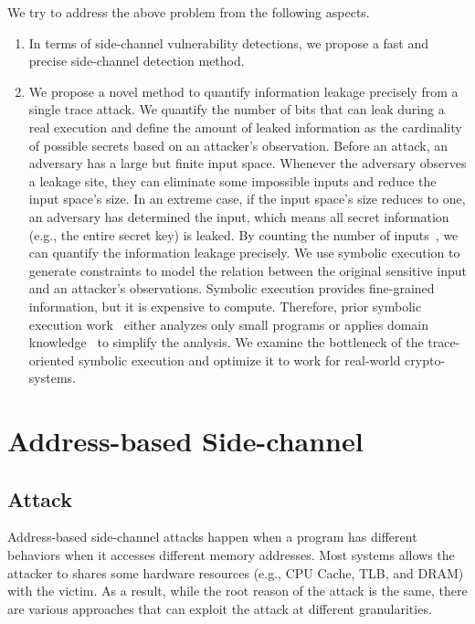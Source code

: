 We try to address the above problem from the following aspects.
\begin{enumerate}
\item In terms of side-channel vulnerability detections, we propose a fast and precise side-channel detection method. 
\item We propose a novel method to quantify information 
leakage precisely from a single trace attack. We quantify the number of bits that can leak during a real execution and define the amount of leaked information as the cardinality of possible secrets based on an attacker's observation. Before an attack, an adversary has a large but finite input space. Whenever the adversary observes a leakage site, they can eliminate some impossible inputs and reduce the input space's size. In an extreme case, if the input space's size reduces to one, an adversary has determined the input, which means all secret information (e.g., the entire secret key) is
leaked. By counting the number of inputs~\cite{10.1007/11499107_24}, we can quantify the information leakage precisely. We use symbolic execution to generate constraints to model the relation 
between the original sensitive input and an attacker's observations. 
Symbolic execution provides fine-grained information, but it is expensive
to compute. Therefore, prior symbolic
execution work~\cite{203878,236338,Brotzman19Casym} either analyzes only
small programs or applies domain knowledge~\cite{203878} to simplify the analysis. We examine the bottleneck of the trace-oriented symbolic execution and optimize it to work for real-world crypto-systems.

\end{enumerate}





\section{Address-based Side-channel}
\subsection{Attack}
Address-based side-channel attacks happen when a program has different behaviors when it accesses different memory addresses. Most systems allows the attacker to shares some hardware resources (e.g., CPU Cache, TLB, and DRAM) with the victim. As a result, while the root reason of the attack is the same, there are various approaches that can exploit the attack at different granularities. 

